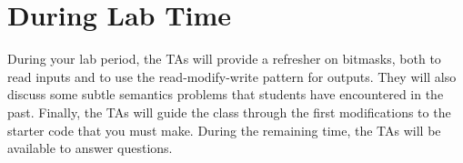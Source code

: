 \section*{During Lab Time}

During your lab period, the TAs will provide a refresher on bitmasks, both to read inputs and to use the read-modify-write pattern for outputs.
They will also discuss some subtle semantics problems that students have encountered in the past.
Finally, the TAs will guide the class through the first modifications to the starter code that you must make.
During the remaining time, the TAs will be available to answer questions.